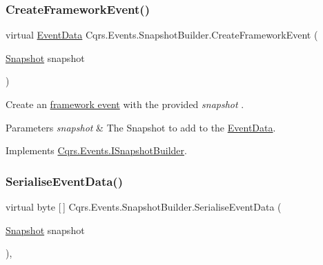 \subsubsection{\texorpdfstring{Create\+Framework\+Event()}{CreateFrameworkEvent()}\hspace{0.1cm}{\footnotesize\ttfamily [2/2]}}
{\footnotesize\ttfamily virtual \hyperlink{classCqrs_1_1Events_1_1EventData}{Event\+Data} Cqrs.\+Events.\+Snapshot\+Builder.\+Create\+Framework\+Event (\begin{DoxyParamCaption}\item[{\hyperlink{classCqrs_1_1Snapshots_1_1Snapshot}{Snapshot}}]{snapshot }\end{DoxyParamCaption})\hspace{0.3cm}{\ttfamily [virtual]}}



Create an \hyperlink{}{framework event} with the provided {\itshape snapshot} . 


\begin{DoxyParams}{Parameters}
{\em snapshot} & The Snapshot to add to the \hyperlink{classCqrs_1_1Events_1_1EventData}{Event\+Data}.\\
\hline
\end{DoxyParams}


Implements \hyperlink{interfaceCqrs_1_1Events_1_1ISnapshotBuilder_afb318f1c84773084414b907e75c4aa0a_afb318f1c84773084414b907e75c4aa0a}{Cqrs.\+Events.\+I\+Snapshot\+Builder}.

\mbox{\label{classCqrs_1_1Events_1_1SnapshotBuilder_a50faca2f63b36d02d9733249449f3baf_a50faca2f63b36d02d9733249449f3baf}} 
\subsubsection{\texorpdfstring{Serialise\+Event\+Data()}{SerialiseEventData()}}
{\footnotesize\ttfamily virtual byte \mbox{[}$\,$\mbox{]} Cqrs.\+Events.\+Snapshot\+Builder.\+Serialise\+Event\+Data (\begin{DoxyParamCaption}\item[{\hyperlink{classCqrs_1_1Snapshots_1_1Snapshot}{Snapshot}}]{snapshot }\end{DoxyParamCaption})\hspace{0.3cm}{\ttfamily [protected]}, {\ttfamily [virtual]}}



